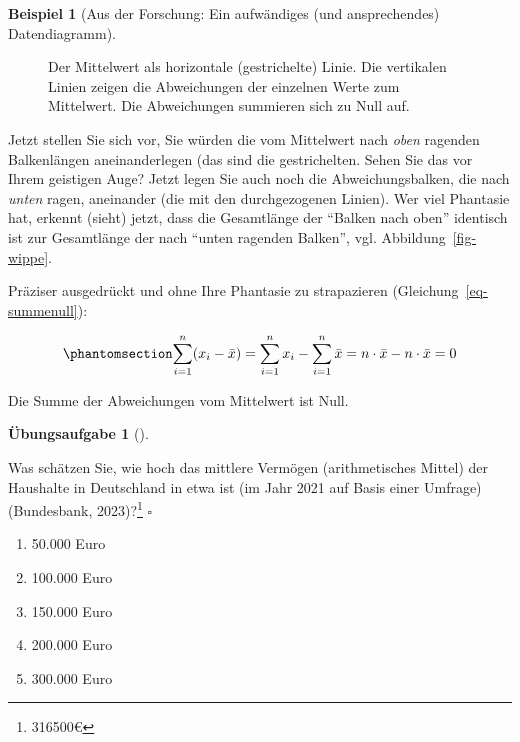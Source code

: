 \documentclass[
  a4paper,
]{scrbook}
\providecommand{\tightlist}{%
  \setlength{\itemsep}{0pt}\setlength{\parskip}{0pt}}\usepackage{longtable,booktabs,array}
\theoremstyle{definition}
\newtheorem{example}{Beispiel}[chapter]
\theoremstyle{definition}
\theoremstyle{definition}
\newtheorem{exercise}{Übungsaufgabe}[chapter]
\theoremstyle{remark}
\begin{document}
\begin{example}[Aus der Forschung: Ein aufwändiges (und ansprechendes)
Datendiagramm]
\begin{figure}
{}

\caption{\label{fig-mw1}Der Mittelwert als horizontale (gestrichelte)
Linie. Die vertikalen Linien zeigen die Abweichungen der einzelnen Werte
zum Mittelwert. Die Abweichungen summieren sich zu Null auf.}

\end{figure}%

Jetzt stellen Sie sich vor, Sie würden die vom Mittelwert nach
\emph{oben} ragenden Balkenlängen aneinanderlegen (das sind die
gestrichelten. Sehen Sie das vor Ihrem geistigen Auge? Jetzt legen Sie
auch noch die Abweichungsbalken, die nach \emph{unten} ragen, aneinander
(die mit den durchgezogenen Linien). Wer viel Phantasie hat, erkennt
(sieht) jetzt, dass die Gesamtlänge der ``Balken nach oben'' identisch
ist zur Gesamtlänge der nach ``unten ragenden Balken'', vgl.
Abbildung~\ref{fig-wippe}.

Präziser ausgedrückt und ohne Ihre Phantasie zu strapazieren
(Gleichung~\ref{eq-summenull}):

\begin{equation}\phantomsection\label{eq-summenull}{\sum_{i=1}^n (x_i-\bar{x})=\sum_{i=1}^n x_i - \sum_{i=1}^n \bar{x} = n\cdot \bar{x} - n\cdot \bar{x}=0}\end{equation}

\begin{tcolorbox}[enhanced jigsaw, colbacktitle=quarto-callout-note-color!10!white, bottomrule=.15mm, left=2mm, breakable, rightrule=.15mm, coltitle=black, title=\textcolor{quarto-callout-note-color}{\faInfo}\hspace{0.5em}{Hinweis}, colback=white, leftrule=.75mm, titlerule=0mm, opacityback=0, bottomtitle=1mm, toprule=.15mm, arc=.35mm, toptitle=1mm, opacitybacktitle=0.6, colframe=quarto-callout-note-color-frame]

Die Summe der Abweichungen vom Mittelwert ist Null.

\end{tcolorbox}

\begin{exercise}[]\protect\hypertarget{exr-mw-wealth1}{}\label{exr-mw-wealth1}

Was schätzen Sie, wie hoch das mittlere Vermögen (arithmetisches Mittel)
der Haushalte in Deutschland in etwa ist (im Jahr 2021 auf Basis einer
Umfrage) (Bundesbank, 2023)?\footnote{316500€} \(\square\)

\begin{enumerate}
\def\labelenumi{\alph{enumi})}
\tightlist
\item
  50.000 Euro
\item
  100.000 Euro
\item
  150.000 Euro
\item
  200.000 Euro
\item
  300.000 Euro
\end{enumerate}


\end{exercise}
\end{example}
\end{document}
